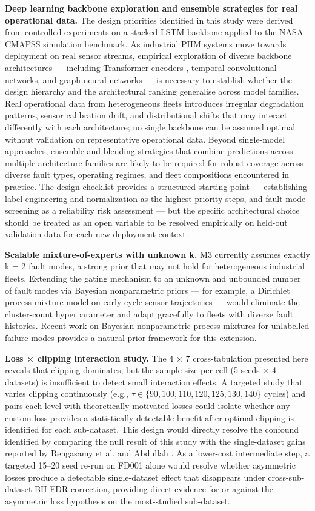 \documentclass[preprint,10pt]{elsarticle}
\begin{document}
\textbf{Deep learning backbone exploration and ensemble strategies for real operational data.} The design priorities identified in this study were derived from controlled experiments on a stacked LSTM backbone applied to the NASA CMAPSS simulation benchmark. As industrial PHM systems move towards deployment on real sensor streams, empirical exploration of diverse backbone architectures — including Transformer encoders \cite{ref08,ref11,ref13,ref14}, temporal convolutional networks, and graph neural networks — is necessary to establish whether the design hierarchy and the architectural ranking generalise across model families. Real operational data from heterogeneous fleets introduces irregular degradation patterns, sensor calibration drift, and distributional shifts that may interact differently with each architecture; no single backbone can be assumed optimal without validation on representative operational data. Beyond single-model approaches, ensemble and blending strategies that combine predictions across multiple architecture families are likely to be required for robust coverage across diverse fault types, operating regimes, and fleet compositions encountered in practice. The design checklist provides a structured starting point — establishing label engineering and normalization as the highest-priority steps, and fault-mode screening as a reliability risk assessment — but the specific architectural choice should be treated as an open variable to be resolved empirically on held-out validation data for each new deployment context.

\textbf{Scalable mixture-of-experts with unknown k.} M3 currently assumes exactly k = 2 fault modes, a strong prior that may not hold for heterogeneous industrial fleets. Extending the gating mechanism to an unknown and unbounded number of fault modes via Bayesian nonparametric priors — for example, a Dirichlet process mixture model on early-cycle sensor trajectories \cite{ref34} — would eliminate the cluster-count hyperparameter and adapt gracefully to fleets with diverse fault histories. Recent work on Bayesian nonparametric process mixtures for unlabelled failure modes \cite{ref34} provides a natural prior framework for this extension.

\textbf{Loss × clipping interaction study.} The 4 × 7 cross-tabulation presented here reveals that clipping dominates, but the sample size per cell (5 seeds × 4 datasets) is insufficient to detect small interaction effects. A targeted study that varies clipping continuously (e.g., $\tau \in \{90, 100, 110, 120, 125, 130, 140\}$ cycles) and pairs each level with theoretically motivated losses could isolate whether any custom loss provides a statistically detectable benefit after optimal clipping is identified for each sub-dataset. This design would directly resolve the confound identified by comparing the null result of this study with the single-dataset gains reported by Rengasamy et al. \cite{ref37} and Abdullah \cite{ref22}. As a lower-cost intermediate step, a targeted 15--20 seed re-run on FD001 alone would resolve whether asymmetric losses produce a detectable single-dataset effect that disappears under cross-sub-dataset BH-FDR correction, providing direct evidence for or against the asymmetric loss hypothesis on the most-studied sub-dataset.
\end{document}

